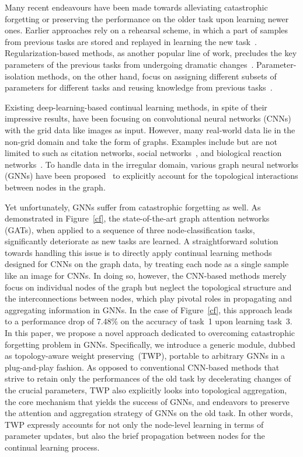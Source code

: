 \documentclass[letterpaper]{article} %
\begin{document}
Many recent endeavours have been made towards alleviating
catastrophic forgetting
or preserving the performance
on the older task upon learning newer ones.
Earlier approaches rely on a rehearsal scheme,
in which a part of samples from previous tasks
are stored and replayed in learning the new task~\cite{lopez2017gradient,rebuffi2017icarl}.
Regularization-based methods, as another popular line of work,
precludes the key parameters of the previous tasks
from undergoing dramatic
changes~\cite{kirkpatrick2017overcoming, li2017learning, aljundi2018memory}.
Parameter-isolation methods, on the other hand,
focus on assigning different subsets of parameters
for different tasks
and reusing knowledge from previous tasks~\cite{rusu2016progressive, fernando2017pathnet, yoon2017lifelong}.

Existing deep-learning-based continual learning methods,
in spite of their impressive results,
have been focusing on convolutional neural networks (CNNs)
with the grid data like images as input.
However, many real-world data
lie in the non-grid domain and
take the form of graphs.
Examples include but are not limited to
such as citation networks, social networks~\cite{newman2004finding},
and biological reaction networks~\cite{pavlopoulos2011using}.
To handle data in the irregular domain,
various graph neural networks (GNNs) have been
proposed~\cite{kipf2016semi,hamilton2017inductive}
to explicitly account for the topological interactions between
nodes in the graph.

Yet unfortunately, GNNs suffer from catastrophic forgetting as well.
As demonstrated in Figure~\ref{cf},
the state-of-the-art graph attention networks (GATs),
when applied to a sequence of three node-classification tasks,
significantly deteriorate
as new tasks are learned.
A straightforward solution towards handling this issue
is to directly apply  continual learning methods designed for CNNs
on the graph data, by
{treating each node as a single sample like an image for CNNs.}
In doing so, however, the CNN-based methods merely focus
on individual nodes of the graph but neglect the topological structure
and the interconnections between nodes,
which play pivotal roles in  propagating and aggregating information
in GNNs. In the case of Figure~\ref{cf},
this approach leads to a performance drop
of 7.48$\%$ on the accuracy of task~1
upon learning task~3.
In this paper, we propose a novel approach
dedicated to overcoming
catastrophic forgetting problem in GNNs.
Specifically, we introduce a generic module,
dubbed as topology-aware weight preserving~(TWP),
portable to arbitrary GNNs in a plug-and-play fashion.
As opposed to conventional CNN-based methods that
strive to retain only the performances of the old
task by decelerating changes of the crucial parameters,
TWP also explicitly looks into topological aggregation,
the core mechanism that yields the success of GNNs,
and endeavors to preserve the attention
and aggregation strategy of GNNs on the old task.
In other words, TWP expressly accounts for
not only the node-level learning
in terms of parameter updates,
but also the brief propagation between nodes
for the continual learning process.
\end{document}
